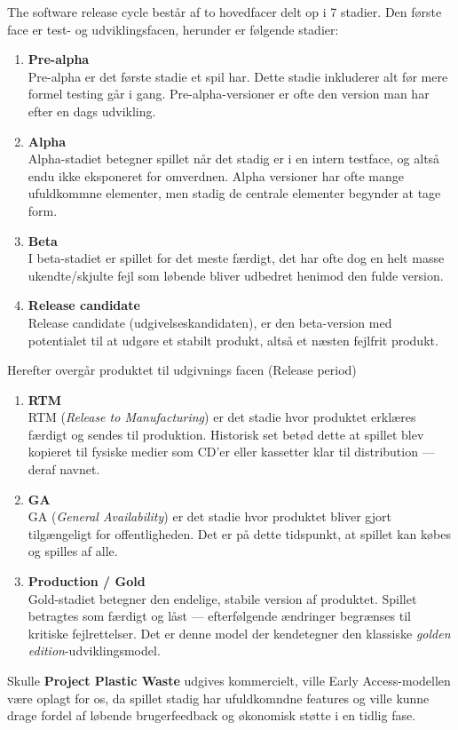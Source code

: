The software release cycle består af to hovedfacer delt op i 7 stadier. Den første face er test- og udviklingsfacen, herunder er følgende stadier:
\begin{enumerate}
    \item \textbf{Pre-alpha}\\
    Pre-alpha er det første stadie et spil har. Dette stadie inkluderer alt før mere formel testing går i gang. Pre-alpha-versioner er ofte den version man har efter en dags udvikling.
    \item \textbf{Alpha}\\
    Alpha-stadiet betegner spillet når det stadig er i en intern testface, og altså endu ikke eksponeret for omverdnen. Alpha versioner har ofte mange ufuldkommne elementer, men stadig de centrale elementer begynder at tage form.
    \item \textbf{Beta}\\
    I beta-stadiet er spillet for det meste færdigt, det har ofte dog en helt masse ukendte/skjulte fejl som løbende bliver udbedret henimod den fulde version.
    \item \textbf{Release candidate}\\
    Release candidate (udgivelseskandidaten), er den beta-version med potentialet til at udgøre et stabilt produkt, altså et næsten fejlfrit produkt.
\end{enumerate}

Herefter overgår produktet til udgivnings facen (Release period)
\begin{enumerate}
    \item \textbf{RTM}\\
    RTM (\textit{Release to Manufacturing}) er det stadie hvor produktet erklæres færdigt og 
    sendes til produktion. Historisk set betød dette at spillet blev kopieret til fysiske medier 
    som CD'er eller kassetter klar til distribution — deraf navnet.
    \item \textbf{GA}\\
    GA (\textit{General Availability}) er det stadie hvor produktet bliver gjort tilgængeligt 
    for offentligheden. Det er på dette tidspunkt, at spillet kan købes og spilles af alle.
    \item \textbf{Production / Gold}\\
    Gold-stadiet betegner den endelige, stabile version af produktet. Spillet betragtes som 
    færdigt og låst — efterfølgende ændringer begrænses til kritiske fejlrettelser. Det er 
    denne model der kendetegner den klassiske \textit{golden edition}-udviklingsmodel.
\end{enumerate}


Skulle \textbf{Project Plastic Waste} udgives kommercielt, ville Early Access-modellen være oplagt for os, da spillet stadig har ufuldkomndne features og ville kunne drage fordel af løbende brugerfeedback og økonomisk støtte i en tidlig fase.



